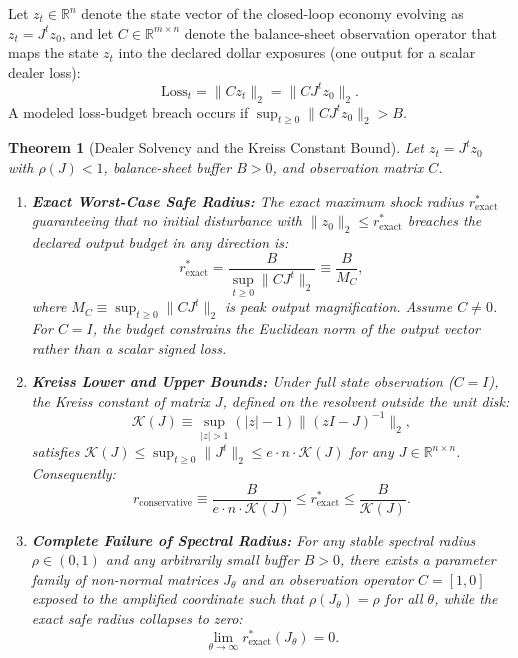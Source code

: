 \documentclass[12pt]{article}
\newtheorem{theorem}{Theorem}[section]
\theoremstyle{definition}
\theoremstyle{remark}
\newcommand{\R}{\mathbb{R}}
\begin{document}
Let $z_t \in \R^n$ denote the state vector of the closed-loop economy evolving as $z_t = J^t z_0$, and let $C\in\R^{m\times n}$ denote the balance-sheet observation operator that maps the state $z_t$ into the declared dollar exposures (one output for a scalar dealer loss):
\begin{equation}
\text{Loss}_t = \|Cz_t\|_2=\|CJ^tz_0\|_2.
\end{equation}
A modeled loss-budget breach occurs if $\sup_{t \ge 0} \|C J^t z_0\|_2 > B$.

\begin{theorem}[Dealer Solvency and the Kreiss Constant Bound]
\label{thm:m5_kreiss_solvency}
Let $z_t = J^t z_0$ with $\rho(J) < 1$, balance-sheet buffer $B > 0$, and observation matrix $C$.
\begin{enumerate}
    \item \textbf{Exact Worst-Case Safe Radius:} The exact maximum shock radius $r^*_{\text{exact}}$ guaranteeing that no initial disturbance with $\|z_0\|_2 \le r^*_{\text{exact}}$ breaches the declared output budget in any direction is:
    \begin{equation}
    r^*_{\text{exact}} = \frac{B}{\sup_{t \ge 0} \|C J^t\|_2} \equiv \frac{B}{M_C},
    \label{eq:exact_safe_radius}
    \end{equation}
    where $M_C \equiv \sup_{t \ge0}\|CJ^t\|_2$ is peak output magnification. Assume $C\ne0$. For $C=I$, the budget constrains the Euclidean norm of the output vector rather than a scalar signed loss.
    \item \textbf{Kreiss Lower and Upper Bounds:} Under full state observation ($C = I$), the Kreiss constant of matrix $J$, defined on the resolvent outside the unit disk:
    \begin{equation}
    \mathcal{K}(J) \equiv \sup_{|z| > 1} (|z| - 1) \|(zI - J)^{-1}\|_2,
    \label{eq:kreiss_def}
    \end{equation}
    satisfies $\mathcal{K}(J) \le \sup_{t \ge 0} \|J^t\|_2 \le e \cdot n \cdot \mathcal{K}(J)$ for any $J \in \R^{n \times n}$. Consequently:
    \begin{equation}
    r_{\text{conservative}} \equiv \frac{B}{e \cdot n \cdot \mathcal{K}(J)} \le r^*_{\text{exact}} \le \frac{B}{\mathcal{K}(J)}.
    \label{eq:kreiss_bilateral_bound}
    \end{equation}
    \item \textbf{Complete Failure of Spectral Radius:} For any stable spectral radius $\rho \in (0, 1)$ and any arbitrarily small buffer $B > 0$, there exists a parameter family of non-normal matrices $J_\theta$ and an observation operator $C = [1, 0]$ exposed to the amplified coordinate such that $\rho(J_\theta) = \rho$ for all $\theta$, while the exact safe radius collapses to zero:
    \begin{equation}
    \lim_{\theta \to \infty} r^*_{\text{exact}}(J_\theta) = 0.
    \end{equation}
\end{enumerate}
\end{theorem}
\end{document}
